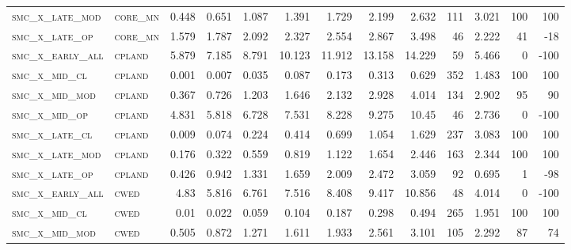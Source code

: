 \begin{landscape}
\begin{center}
\begin{footnotesize}
\begin{longtable}{llrrrrrrrr|rrr}
\textsc{smc\_x\_late\_mod } & \textsc{core\_mn  }   & 0.448    & 0.651    & 1.087    & 1.391    & 1.729    & 2.199    & 2.632    & 111    & 3.021         & 100           & 100             \\
\textsc{smc\_x\_late\_op  } & \textsc{core\_mn  }   & 1.579    & 1.787    & 2.092    & 2.327    & 2.554    & 2.867    & 3.498    & 46     & 2.222         & 41            & -18             \\
\textsc{smc\_x\_early\_all} & \textsc{cpland    }   & 5.879    & 7.185    & 8.791    & 10.123   & 11.912   & 13.158   & 14.229   & 59     & 5.466         & 0             & -100            \\
\textsc{smc\_x\_mid\_cl   } & \textsc{cpland    }   & 0.001    & 0.007    & 0.035    & 0.087    & 0.173    & 0.313    & 0.629    & 352    & 1.483         & 100           & 100             \\
\textsc{smc\_x\_mid\_mod  } & \textsc{cpland    }   & 0.367    & 0.726    & 1.203    & 1.646    & 2.132    & 2.928    & 4.014    & 134    & 2.902         & 95            & 90              \\
\textsc{smc\_x\_mid\_op   } & \textsc{cpland    }   & 4.831    & 5.818    & 6.728    & 7.531    & 8.228    & 9.275    & 10.45    & 46     & 2.736         & 0             & -100            \\
\textsc{smc\_x\_late\_cl  } & \textsc{cpland    }   & 0.009    & 0.074    & 0.224    & 0.414    & 0.699    & 1.054    & 1.629    & 237    & 3.083         & 100           & 100             \\
\textsc{smc\_x\_late\_mod } & \textsc{cpland    }   & 0.176    & 0.322    & 0.559    & 0.819    & 1.122    & 1.654    & 2.446    & 163    & 2.344         & 100           & 100             \\
\textsc{smc\_x\_late\_op  } & \textsc{cpland    }   & 0.426    & 0.942    & 1.331    & 1.659    & 2.009    & 2.472    & 3.059    & 92     & 0.695         & 1             & -98             \\
\textsc{smc\_x\_early\_all} & \textsc{cwed      }   & 4.83     & 5.816    & 6.761    & 7.516    & 8.408    & 9.417    & 10.856   & 48     & 4.014         & 0             & -100            \\
\textsc{smc\_x\_mid\_cl   } & \textsc{cwed      }   & 0.01     & 0.022    & 0.059    & 0.104    & 0.187    & 0.298    & 0.494    & 265    & 1.951         & 100           & 100             \\
\textsc{smc\_x\_mid\_mod  } & \textsc{cwed      }   & 0.505    & 0.872    & 1.271    & 1.611    & 1.933    & 2.561    & 3.101    & 105    & 2.292         & 87            & 74              \\

\end{longtable}
\end{footnotesize}
\end{center}
\end{landscape}
